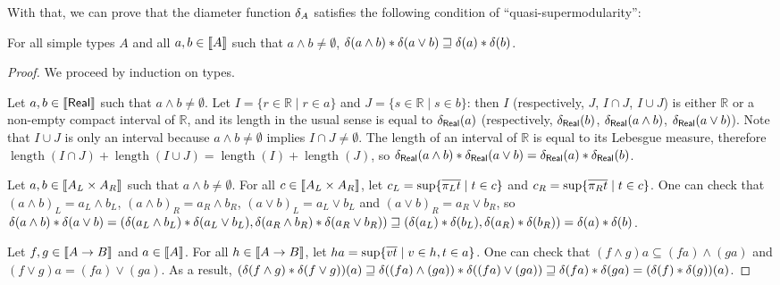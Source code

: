 With that, we can prove that the diameter function $\delta_{A}$ satisfies the following condition of ``quasi-supermodularity'':
\begin{proposition} For all simple types $A$ and all $a,b \in \llbracket A \rrbracket$ such that $a \wedge b \neq \emptyset$, $\delta(a \wedge b) \mathbin{\ast} \delta(a \vee b) \sqsupseteq \delta(a) \mathbin{\ast} \delta(b)$.
\end{proposition}
\begin{proof}
We proceed by induction on types.

Let $a,b \in \llbracket \mathsf{Real} \rrbracket$ such that $a\wedge b \neq \emptyset$. Let $I = \{r \in \mathbb{R} \mid r \in a\}$ and $J = \{s \in \mathbb{R} \mid s \in b\}$: then $I$ (respectively, $J$, $I \cap J$, $I \cup J$) is either $\mathbb{R}$ or a non-empty compact interval of $\mathbb{R}$, and its length in the usual sense is equal to $\delta_\mathsf{Real}(a)$ (respectively, $\delta_\mathsf{Real}(b)$, $\delta_\mathsf{Real}(a \wedge b)$, $\delta_\mathsf{Real}(a \vee b)$). Note that $I \cup J$ is only an interval because $a\wedge b \neq \emptyset$ implies $I \cap J \neq \emptyset$. The length of an interval of $\mathbb{R}$ is equal to its Lebesgue measure, therefore $\operatorname{length}(I \cap J) + \operatorname{length}(I \cup J) = \operatorname{length}(I) + \operatorname{length}(J)$, so $\delta_\mathsf{Real}(a \wedge b) \mathbin{\ast} \delta_\mathsf{Real}(a \vee b) = \delta_\mathsf{Real}(a) \mathbin{\ast} \delta_\mathsf{Real}(b)$.

Let $a,b \in \llbracket A_L \times A_R \rrbracket$ such that $a\wedge b \neq \emptyset$. For all $c \in \llbracket A_L \times A_R \rrbracket$, let $c_L = \sup\{\overline{\pi_L t} \mid t \in c\}$ and $c_R = \sup\{\overline{\pi_R t} \mid t \in c\}$.
One can check that $(a \wedge b)_L = a_L \wedge b_L$, $(a \wedge b)_R = a_R \wedge b_R$, $(a \vee b)_L = a_L \vee b_L$ and $(a \vee b)_R = a_R \vee b_R$, so $\delta(a \wedge b) \mathbin{\ast} \delta(a \vee b) = (\delta(a_L \wedge b_L) \mathbin{\ast} \delta(a_L \vee b_L),  \delta(a_R \wedge b_R) \mathbin{\ast} \delta(a_R \vee b_R)) \sqsupseteq (\delta(a_L) \mathbin{\ast} \delta(b_L), \delta(a_R) \mathbin{\ast} \delta(b_R)) = \delta(a) \mathbin{\ast} \delta(b)$.

Let $f,g \in \llbracket A \to B \rrbracket$ and $a \in \llbracket A \rrbracket$. For all $h \in \llbracket A \to B \rrbracket$, let $ha = \sup\{\overline{vt} \mid v \in h, t \in a\}$. One can check that $(f \wedge g)a \subseteq (f a) \wedge (g a)$ and $(f \vee g)a = (f a) \vee (g a)$. As a result, $(\delta(f \wedge g)\mathbin{\ast} \delta(f \vee g))(a) \sqsupseteq \delta((fa) \wedge (ga)) \mathbin{\ast} \delta((fa) \vee (ga)) \sqsupseteq \delta(fa) \mathbin{\ast} \delta(ga) = (\delta(f)\mathbin{\ast}\delta(g))(a)$.
\end{proof}

